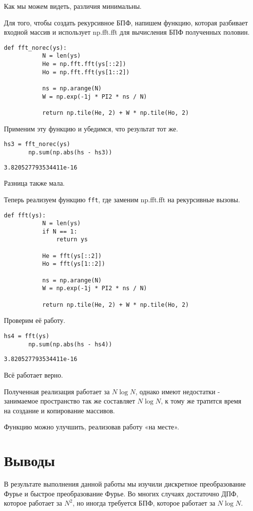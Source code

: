 \documentclass[a4paper,12pt]{report}
\begin{document}
    Как мы можем видеть, различия минимальны.
    
    Для того, чтобы создать рекурсивное БПФ, напишем функцию, которая разбивает входной массив и использует np.fft.fft для вычисления БПФ полученных половин.
\begin{lstlisting}[caption=Функция fft\_norec]
       def fft_norec(ys):
           N = len(ys)
           He = np.fft.fft(ys[::2])
           Ho = np.fft.fft(ys[1::2])
    
           ns = np.arange(N)
           W = np.exp(-1j * PI2 * ns / N)
    
           return np.tile(He, 2) + W * np.tile(Ho, 2)
\end{lstlisting}  
    
    Применим эту функцию и убедимся, что результат тот же.
\begin{lstlisting}[caption=Применение функции fft\_norec]
       hs3 = fft_norec(ys)
       np.sum(np.abs(hs - hs3))
\end{lstlisting}  
\begin{lstlisting}[caption=Полученные результаты]
       3.820527793534411e-16
\end{lstlisting} 

    Разница также мала.
    
    Теперь реализуем функцию \texttt{fft}, где заменим np.fft.fft на рекурсивные вызовы.
\begin{lstlisting}[caption=Функция fft]
       def fft(ys):
           N = len(ys)
           if N == 1:
               return ys
    
           He = fft(ys[::2])
           Ho = fft(ys[1::2])
    
           ns = np.arange(N)
           W = np.exp(-1j * PI2 * ns / N)
    
           return np.tile(He, 2) + W * np.tile(Ho, 2)
\end{lstlisting}

    Проверим её работу.
\begin{lstlisting}[caption=Применение функции fft]
       hs4 = fft(ys)
       np.sum(np.abs(hs - hs4))
\end{lstlisting}  
\begin{lstlisting}[caption=Полученные результаты]
       3.820527793534411e-16
\end{lstlisting} 

    Всё работает верно.
    
    Полученная реализация работает за $N \log N$, однако имеют недостатки - занимаемое пространство так же составляет $N \log N$, к тому же тратится время на создание и копирование массивов. 
    
    Функцию можно улучшить, реализовав работу «на месте».
\chapter{Выводы}
    В результате выполнения данной работы мы изучили дискретное преобразование Фурье и быстрое преобразование Фурье.
    Во многих случаях достаточно ДПФ, которое работает за $N^2$, но иногда требуется БПФ, которое работает за $N \log N$.
\end{document}
